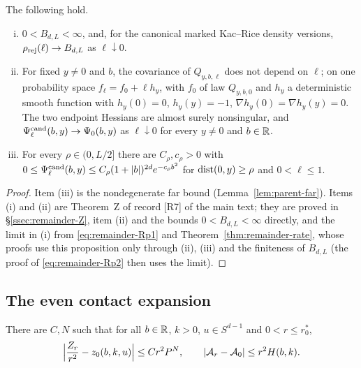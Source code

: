 \begin{proposition}\label{prop:remainder-Z}
The following hold.
\begin{enumerate}[(i),leftmargin=2em]
\item $0<B_{d,L}<\infty$, and, for the canonical marked Kac--Rice density versions, $\rho_{\mathrm{rej}}(\ell)\to B_{d,L}$ as $\ell\downarrow0$.
\item For fixed $y\ne0$ and $b$, the covariance of $Q_{y,b,\ell}$ does not depend on $\ell$; on one probability space $f_\ell=f_0+\ell h_y$, with $f_0$ of law $Q_{y,b,0}$ and $h_y$ a deterministic smooth function with $h_y(0)=0$, $h_y(y)=-1$, $\nabla h_y(0)=\nabla h_y(y)=0$. The two endpoint Hessians are almost surely nonsingular, and $\Psi^{\mathrm{cand}}_\ell(b,y)\to\Psi_0(b,y)$ as $\ell\downarrow0$ for every $y\ne0$ and $b\in\mathbb R$.
\item For every $\rho\in(0,L/2]$ there are $C_\rho,c_\rho>0$ with $0\le\Psi^{\mathrm{cand}}_\ell(b,y)\le C_\rho(1+|b|)^{2d}e^{-c_\rho b^2}$ for $\operatorname{dist}(0,y)\ge\rho$ and $0<\ell\le1$.
\end{enumerate}
\end{proposition}

\begin{proof}
Item (iii) is the nondegenerate far bound \cite[\S14, (14.1)]{parentP} (Lemma~\ref{lem:parent-far}). Items (i) and (ii) are Theorem~Z of record [R7] of the main text; they are proved in \S\ref{ssec:remainder-Z}, item (ii) and the bounds $0<B_{d,L}<\infty$ directly, and the limit in (i) from \eqref{eq:remainder-Rp1} and Theorem~\ref{thm:remainder-rate}, whose proofs use this proposition only through (ii), (iii) and the finiteness of $B_{d,L}$ (the proof of \eqref{eq:remainder-Rp2} then uses the limit).
\end{proof}

\subsection{The even contact expansion}\label{ssec:remainder-even}

\begin{lemma}\label{lem:remainder-even}
There are $C,N$ such that for all $b\in\mathbb R$, $k>0$, $u\in S^{d-1}$ and $0<r\le r_0^*$,
\begin{equation}\label{eq:remainder-E}
\Bigl|\frac{Z_r}{r^2}-z_0(b,k,u)\Bigr|\le Cr^2P^N,\qquad |\mathcal A_r-\mathcal A_0|\le r^2H(b,k).
\end{equation}
\end{lemma}

